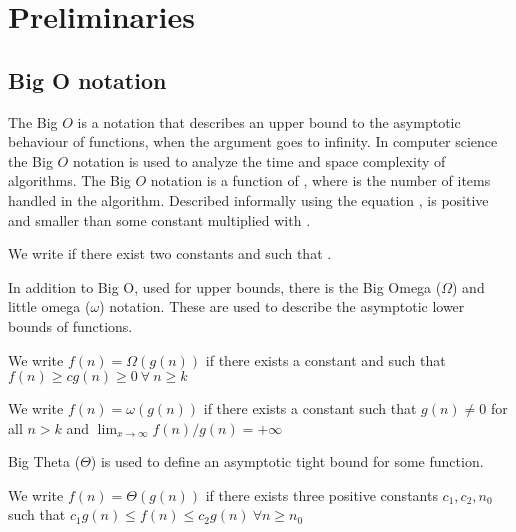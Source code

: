 \section{Preliminaries}

\subsection{Big O notation}

 The Big $O$ is a notation that describes an upper bound to the asymptotic behaviour of functions, when the argument goes to infinity. In computer science the Big $O$ notation is used to analyze the time and space complexity of algorithms. The Big $O$ notation is a function of , where  is the number of items handled in the algorithm. Described informally using the equation ,  is positive and smaller than some constant multiplied with .
 
 \begin{definition}
 We write  if there exist two constants
  and  such that .
 \end{definition}

In addition to Big O, used for upper bounds, there is the Big Omega ($\Omega$) and little omega ($\omega$) notation. These are used to describe the asymptotic lower bounds of functions. 

 \begin{definition}
 We write $f(n) = \Omega(g(n))$ if there exists a constant
  and  such that $f(n) \geq cg(n) \geq 0 \: \forall \: n \geq k$
 \end{definition}

 \begin{definition}
We write $f(n) = \omega(g(n))$ if there exists a constant
   such that $g(n) \neq 0$ for all $n > k$ and $ \lim_{x \to \infty} f(n) / g(n) = + \infty$
 \end{definition}

Big Theta ($\Theta$) is used to define an asymptotic tight bound for some function. 

 \begin{definition}
    We write $f(n) = \Theta(g(n))$ if there exists three positive constants $c_1, c_2, n_0$ such that $c_1 g(n) \leq f(n) \leq c_2 g(n) \ \forall n \geq n_0$
 \end{definition}



